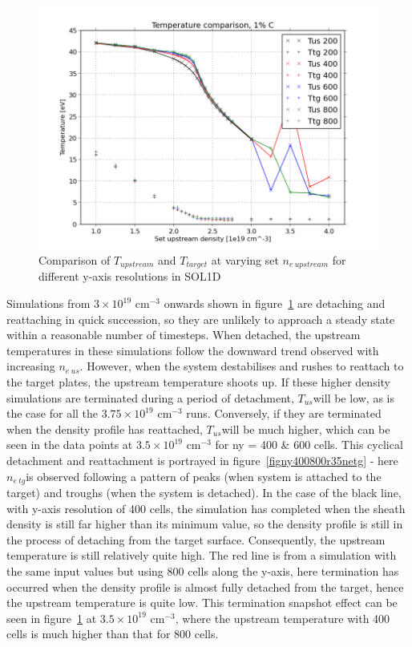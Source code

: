 \documentclass[11pt]{article}  %
\providecommand{\noNe}[1]{{${#1}\times 10^{19}$ cm$^{-3}$}} %
\providecommand{\neus}{$n_{e~us}$} %
\providecommand{\netg}{$n_{e~tg}$} %
\providecommand{\Tus}{$T_{us}$} %
\begin{document}
\begin{figure}
\includegraphics[scale=0.5]{Figures/sol1d/TT_IMPCOMBO2.png}
\centering
\caption{Comparison of $T_{upstream}$ and $T_{target}$ at varying set $n_{e~upstream}$ for different y-axis resolutions in SOL1D}\label{figTT_IMPCOMBO2}
\end{figure}

Simulations from \noNe{3} onwards shown in figure~\ref{figTT_IMPCOMBO2} are detaching and reattaching in quick succession, so they are unlikely to approach a steady state within a reasonable number of timesteps. When detached, the upstream temperatures in these simulations follow the downward trend observed with increasing \neus. However, when the system destabilises and rushes to reattach to the target plates, the upstream temperature shoots up. If these higher density simulations are terminated during a period of detachment, \Tus will be low, as is the case for all the \noNe{3.75} runs. Conversely, if they are terminated when the density profile has reattached, \Tus will be much higher, which can be seen in the data points at \noNe{3.5} for ny = 400 \& 600 cells. This cyclical detachment and reattachment is portrayed in figure~\ref{figny400800r35netg} - here \netg is observed following a pattern of peaks (when system is attached to the target) and troughs (when the system is detached). In the case of the black line, with y-axis resolution of 400 cells, the simulation has completed when the sheath density is still far higher than its minimum value, so the density profile is still in the process of detaching from the target surface. Consequently, the upstream temperature is still relatively quite high. The red line is from a simulation with the same input values but using 800 cells along the y-axis, here termination has occurred when the density profile is almost fully detached from the target, hence the upstream temperature is quite low. This termination snapshot effect can be seen in figure~\ref{figTT_IMPCOMBO2} at \noNe{3.5}, where the upstream temperature with 400 cells is much higher than that for 800 cells.
\end{document}
